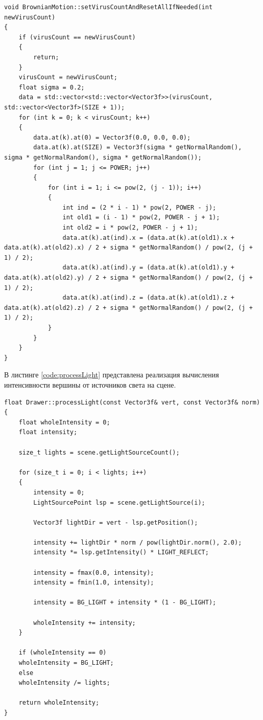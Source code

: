\begin{lstlisting}[label=code:brown,caption=Реализация вычисления изменения координат центров частиц (броуновское движение)]
void BrownianMotion::setVirusCountAndResetAllIfNeeded(int newVirusCount)
{
	if (virusCount == newVirusCount)
	{
		return;
	}
	virusCount = newVirusCount;
	float sigma = 0.2;
	data = std::vector<std::vector<Vector3f>>(virusCount, std::vector<Vector3f>(SIZE + 1));
	for (int k = 0; k < virusCount; k++)
	{
		data.at(k).at(0) = Vector3f(0.0, 0.0, 0.0);
		data.at(k).at(SIZE) = Vector3f(sigma * getNormalRandom(), sigma * getNormalRandom(), sigma * getNormalRandom());
		for (int j = 1; j <= POWER; j++)
		{
			for (int i = 1; i <= pow(2, (j - 1)); i++)
			{
				int ind = (2 * i - 1) * pow(2, POWER - j);
				int old1 = (i - 1) * pow(2, POWER - j + 1);
				int old2 = i * pow(2, POWER - j + 1);
				data.at(k).at(ind).x = (data.at(k).at(old1).x + data.at(k).at(old2).x) / 2 + sigma * getNormalRandom() / pow(2, (j + 1) / 2);
				data.at(k).at(ind).y = (data.at(k).at(old1).y + data.at(k).at(old2).y) / 2 + sigma * getNormalRandom() / pow(2, (j + 1) / 2);
				data.at(k).at(ind).z = (data.at(k).at(old1).z + data.at(k).at(old2).z) / 2 + sigma * getNormalRandom() / pow(2, (j + 1) / 2);
			}
		}
	}
}
\end{lstlisting}

В листинге \ref{code:processLight} представлена реализация вычисления интенсивности вершины от источников света на сцене.

\begin{lstlisting}[label=code:processLight,caption=Реализация вычисления интенсивности вершины]
float Drawer::processLight(const Vector3f& vert, const Vector3f& norm)
{
	float wholeIntensity = 0;
	float intensity;
	
	size_t lights = scene.getLightSourceCount();
	
	for (size_t i = 0; i < lights; i++)
	{
		intensity = 0;
		LightSourcePoint lsp = scene.getLightSource(i);
		
		Vector3f lightDir = vert - lsp.getPosition();
		
		intensity += lightDir * norm / pow(lightDir.norm(), 2.0);
		intensity *= lsp.getIntensity() * LIGHT_REFLECT;
		
		intensity = fmax(0.0, intensity);
		intensity = fmin(1.0, intensity);
		
		intensity = BG_LIGHT + intensity * (1 - BG_LIGHT);
		
		wholeIntensity += intensity;
	}
	
	if (wholeIntensity == 0)
	wholeIntensity = BG_LIGHT;
	else
	wholeIntensity /= lights;
	
	return wholeIntensity;
}
\end{lstlisting}

